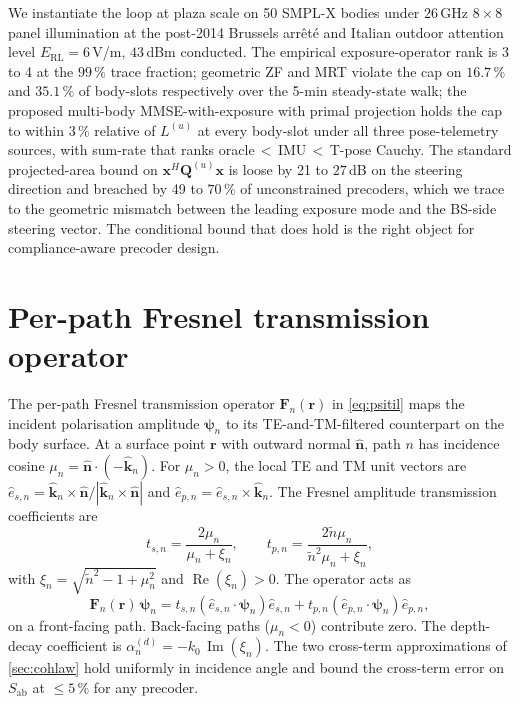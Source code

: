 \documentclass[journal,twocolumn,10pt]{IEEEtran}
\theoremstyle{plain}
\theoremstyle{remark}
\newcommand{\khat}{\hat{\bm{k}}}
\newcommand{\nhat}{\hat{\bm{n}}}
\newcommand{\rr}{\mathbf{r}}
\newcommand{\xx}{\mathbf{x}}
\newcommand{\Sab}{S_{\mathrm{ab}}}
\newcommand{\Qmat}{\mathbf{Q}}
\newcommand{\Fn}{\mathbf{F}_n}
\newcommand{\psin}{\bm{\psi}_n}
\newcommand{\ntilde}{\tilde{n}}
\DeclareMathOperator{\RE}{Re}
\DeclareMathOperator{\IM}{Im}
\begin{document}
We instantiate the loop at plaza scale on 50 SMPL-X bodies under
$26\,$GHz $8 \times 8$ panel illumination at the post-2014 Brussels
arr\^et\'e and Italian outdoor attention level
$E_{\mathrm{RL}} = 6\,$V/m, $43\,$dBm conducted. The empirical
exposure-operator rank is 3 to 4 at the $99\,\%$ trace fraction;
geometric ZF and MRT violate the cap on $16.7\,\%$ and $35.1\,\%$
of body-slots respectively over the 5-min steady-state walk; the
proposed multi-body MMSE-with-exposure with primal projection
holds the cap to within $3\,\%$ relative of $L^{(u)}$ at every
body-slot under all three pose-telemetry sources, with sum-rate
that ranks oracle\,$<$\,IMU\,$<$\,T-pose Cauchy. The standard
projected-area bound on $\xx^H \Qmat^{(u)} \xx$ is loose by 21 to
$27\,$dB on the steering direction and breached by 49 to $70\,\%$
of unconstrained precoders, which we trace to the geometric
mismatch between the leading exposure mode and the BS-side
steering vector. The conditional bound that does hold is the right
object for compliance-aware precoder design.


\appendices

\section{Per-path Fresnel transmission operator}\label{app:fresnel}

The per-path Fresnel transmission operator $\Fn(\rr)$ in
\cref{eq:psitil} maps the incident polarisation amplitude $\psin$
to its TE-and-TM-filtered counterpart on the body surface. At a
surface point $\rr$ with outward normal $\nhat$, path $n$ has
incidence cosine $\mu_n = \nhat \cdot (-\khat_n)$. For $\mu_n > 0$,
the local TE and TM unit vectors are
$\hat{e}_{s,n} = \khat_n \times \nhat / |\khat_n \times \nhat|$ and
$\hat{e}_{p,n} = \hat{e}_{s,n} \times \khat_n$. The Fresnel
amplitude transmission coefficients are
\begin{equation}\label{eq:t-coef-app}
  t_{s,n} = \frac{2 \mu_n}{\mu_n + \xi_n},
  \qquad
  t_{p,n} = \frac{2 \ntilde \mu_n}{\ntilde^2 \mu_n + \xi_n},
\end{equation}
with $\xi_n = \sqrt{\ntilde^2 - 1 + \mu_n^2}$ and
$\RE(\xi_n) > 0$. The operator acts as
\begin{equation}\label{eq:F-action}
  \Fn(\rr)\,\psin = t_{s,n}(\hat{e}_{s,n} \cdot \psin)
  \hat{e}_{s,n} + t_{p,n}(\hat{e}_{p,n} \cdot \psin) \hat{e}_{p,n},
\end{equation}
on a front-facing path. Back-facing paths ($\mu_n < 0$) contribute
zero. The depth-decay coefficient is
$\alpha_n^{(d)} = -k_0\,\IM(\xi_n)$. The two cross-term
approximations of \cref{sec:cohlaw} hold uniformly in incidence
angle and bound the cross-term error on $\Sab$ at $\leq 5\,\%$ for
any precoder.
\end{document}

